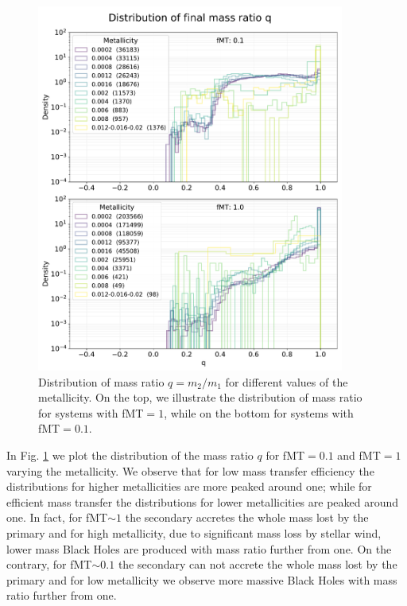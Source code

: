 \documentclass[prb,twocolumn,9pt]{revtex4-1}
\begin{document}
\begin{figure}[!t]
    \begin{minipage}[l]{1.0\columnwidth}
    \centering
    \includegraphics[width=0.9\textwidth]{images/assignment1/mass_ratio_2.pdf}
    \caption{Distribution of mass ratio \(q=m_2/m_1\) for different values of the metallicity. On the top, we illustrate the distribution of mass ratio for systems with fMT\(=1\), while on the bottom for systems with fMT\(=0.1\). 
    }
    \label{fig:ass1_histq}
    \end{minipage}
\end{figure}

In Fig. \ref{fig:ass1_histq} we plot the distribution of the mass ratio \(q\) for fMT\(=0.1\) and fMT\(=1\) varying the metallicity. We observe that for low mass transfer efficiency the distributions for higher metallicities are more peaked around one; while for efficient mass transfer the distributions for lower metallicities are peaked around one. In fact, for fMT\(\sim 1\) the secondary accretes the whole mass lost by the primary and for high metallicity, due to significant mass loss by stellar wind, lower mass Black Holes are produced with mass ratio further from one. On the contrary, for fMT\(\sim 0.1\) the secondary can not accrete the whole mass lost by the primary and for low metallicity we observe more massive Black Holes with mass ratio further from one.
\end{document}
